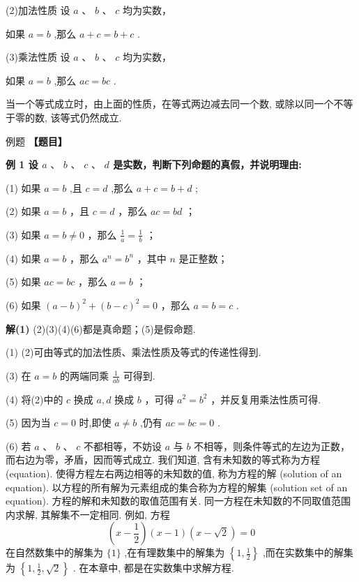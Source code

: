 \documentclass[a4paper,10pt,oneside,fontset=none]{ctexbook}
\newcounter{example}[chapter]
\newenvironment{example}[1][]{\begin{exBox}{例题}{#1}}{\end{exBox}}
\numberwithin{equation}{chapter}
\newenvironment{solution}{\begin{solutionBox}}{\end{solutionBox}}
\begin{document}
(2)加法性质 设 $a\text{ 、 }b\text{ 、 }c$ 均为实数，

如果 $a = b$ ,那么 $a + c = b + c$ .

(3)乘法性质 设 $a\text{ 、 }b\text{ 、 }c$ 均为实数，

如果 $a = b$ ,那么 ${ac} = {bc}$ .

当一个等式成立时，由上面的性质，在等式两边减去同一个数, 或除以同一个不等于零的数, 该等式仍然成立.

\begin{example}
\textbf{【题目】}\par\vspace{0.3em}
\textbf{例 1 设 $a\text{ 、 }b\text{ 、 }c\text{ 、 }d$ 是实数，判断下列命题的真假，并说明理由:}\par\vspace{0.3em}
\par
(1) 如果 $a = b$ ,且 $c = d$ ,那么 $a + c = b + d$ ;
\par
(2) 如果 $a = b$ ，且 $c = d$ ，那么 ${ac} = {bd}$ ；
\par
(3) 如果 $a = b \neq  0$ ，那么 $\frac{1}{a} = \frac{1}{b}$ ；
\par
(4) 如果 $a = b$ ，那么 ${a}^{n} = {b}^{n}$ ，其中 $n$ 是正整数；
\par
(5) 如果 ${ac} = {bc}$ ，那么 $a = b$ ；
\par
(6) 如果 ${\left( a - b\right) }^{2} + {\left( b - c\right) }^{2} = 0$ ，那么 $a = b = c$ .
\end{example}

\begin{solution}
\textbf{解(1)} (2)(3)(4)(6)都是真命题；(5)是假命题.
\par
(1) (2)可由等式的加法性质、乘法性质及等式的传递性得到.
\par
(3) 在 $a = b$ 的两端同乘 $\frac{1}{ab}$ 可得到.
\par
(4) 将(2)中的 $c$ 换成 $a, d$ 换成 $b$ ，可得 ${a}^{2} = {b}^{2}$ ，并反复用乘法性质可得.
\par
(5) 因为当 $c = 0$ 时,即使 $a \neq  b$ ,仍有 ${ac} = {bc} = 0$ .
\par
(6) 若 $a\text{ 、 }b\text{ 、 }c$ 不都相等，不妨设 $a$ 与 $b$ 不相等，则条件等式的左边为正数，而右边为零，矛盾，因而等式成立.
我们知道, 含有未知数的等式称为方程 (equation). 使得方程左右两边相等的未知数的值, 称为方程的解 (solution of an equation). 以方程的所有解为元素组成的集合称为方程的解集 (solution set of an equation).
方程的解和未知数的取值范围有关. 同一方程在未知数的不同取值范围内求解, 其解集不一定相同. 例如, 方程
$$
\left( {x - \frac{1}{2}}\right) \left( {x - 1}\right) \left( {x - \sqrt{2}}\right)  = 0
$$
在自然数集中的解集为 $\{ 1\}$ ,在有理数集中的解集为 $\left\{  {1,\frac{1}{2}}\right\}$ ,而在实数集中的解集为 $\left\{  {1,\frac{1}{2},\sqrt{2}}\right\}$ .
在本章中, 都是在实数集中求解方程.
\end{solution}
\end{document}
